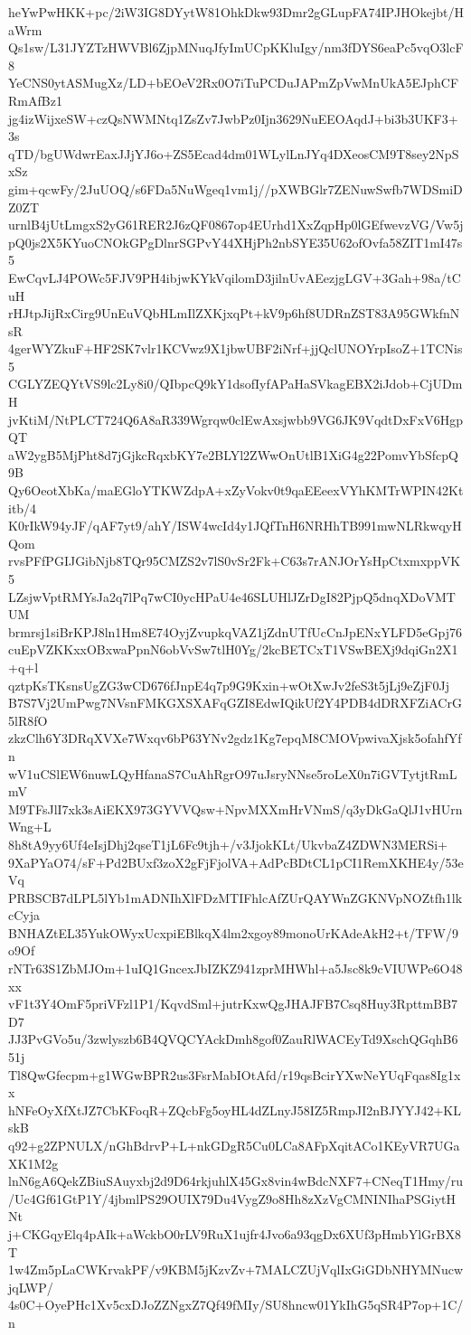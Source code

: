 heYwPwHKK+pc/2iW3IG8DYytW81OhkDkw93Dmr2gGLupFA74IPJHOkejbt/HaWrm
Qs1sw/L31JYZTzHWVBl6ZjpMNuqJfyImUCpKKluIgy/nm3fDYS6eaPc5vqO3lcF8
YeCNS0ytASMugXz/LD+bEOeV2Rx0O7iTuPCDuJAPmZpVwMnUkA5EJphCFRmAfBz1
jg4izWijxeSW+czQsNWMNtq1ZsZv7JwbPz0Ijn3629NuEEOAqdJ+bi3b3UKF3+3s
qTD/bgUWdwrEaxJJjYJ6o+ZS5Ecad4dm01WLylLnJYq4DXeosCM9T8sey2NpSxSz
gim+qcwFy/2JuUOQ/s6FDa5NuWgeq1vm1j//pXWBGlr7ZENuwSwfb7WDSmiDZ0ZT
urnlB4jUtLmgxS2yG61RER2J6zQF0867op4EUrhd1XxZqpHp0lGEfwevzVG/Vw5j
pQ0js2X5KYuoCNOkGPgDlnrSGPvY44XHjPh2nbSYE35U62ofOvfa58ZIT1mI47s5
EwCqvLJ4POWc5FJV9PH4ibjwKYkVqilomD3jilnUvAEezjgLGV+3Gah+98a/tCuH
rHJtpJijRxCirg9UnEuVQbHLmIlZXKjxqPt+kV9p6hf8UDRnZST83A95GWkfnNsR
4gerWYZkuF+HF2SK7vlr1KCVwz9X1jbwUBF2iNrf+jjQclUNOYrpIsoZ+1TCNis5
CGLYZEQYtVS9lc2Ly8i0/QIbpcQ9kY1dsofIyfAPaHaSVkagEBX2iJdob+CjUDmH
jvKtiM/NtPLCT724Q6A8aR339Wgrqw0clEwAxsjwbb9VG6JK9VqdtDxFxV6HgpQT
aW2ygB5MjPht8d7jGjkcRqxbKY7e2BLYl2ZWwOnUtlB1XiG4g22PomvYbSfcpQ9B
Qy6OeotXbKa/maEGloYTKWZdpA+xZyVokv0t9qaEEeexVYhKMTrWPIN42Ktitb/4
K0rIkW94yJF/qAF7yt9/ahY/ISW4wcId4y1JQfTnH6NRHhTB991mwNLRkwqyHQom
rvsPFfPGIJGibNjb8TQr95CMZS2v7lS0vSr2Fk+C63s7rANJOrYsHpCtxmxppVK5
LZsjwVptRMYsJa2q7lPq7wCI0ycHPaU4e46SLUHlJZrDgI82PjpQ5dnqXDoVMTUM
brmrsj1siBrKPJ8ln1Hm8E74OyjZvupkqVAZ1jZdnUTfUcCnJpENxYLFD5eGpj76
cuEpVZKKxxOBxwaPpnN6obVvSw7tlH0Yg/2kcBETCxT1VSwBEXj9dqiGn2X1+q+l
qztpKsTKsnsUgZG3wCD676fJnpE4q7p9G9Kxin+wOtXwJv2feS3t5jLj9eZjF0Jj
B7S7Vj2UmPwg7NVsnFMKGXSXAFqGZI8EdwIQikUf2Y4PDB4dDRXFZiACrG5lR8fO
zkzClh6Y3DRqXVXe7Wxqv6bP63YNv2gdz1Kg7epqM8CMOVpwivaXjsk5ofahfYfn
wV1uCSlEW6nuwLQyHfanaS7CuAhRgrO97uJsryNNse5roLeX0n7iGVTytjtRmLmV
M9TFsJlI7xk3sAiEKX973GYVVQsw+NpvMXXmHrVNmS/q3yDkGaQlJ1vHUrnWng+L
8h8tA9yy6Uf4eIsjDhj2qseT1jL6Fc9tjh+/v3JjokKLt/UkvbaZ4ZDWN3MERSi+
9XaPYaO74/sF+Pd2BUxf3zoX2gFjFjolVA+AdPcBDtCL1pCI1RemXKHE4y/53eVq
PRBSCB7dLPL5lYb1mADNIhXlFDzMTIFhlcAfZUrQAYWnZGKNVpNOZtfh1lkcCyja
BNHAZtEL35YukOWyxUcxpiEBlkqX4lm2xgoy89monoUrKAdeAkH2+t/TFW/9o9Of
rNTr63S1ZbMJOm+1uIQ1GncexJbIZKZ941zprMHWhl+a5Jsc8k9cVIUWPe6O48xx
vF1t3Y4OmF5priVFzl1P1/KqvdSml+jutrKxwQgJHAJFB7Csq8Huy3RpttmBB7D7
JJ3PvGVo5u/3zwlyszb6B4QVQCYAckDmh8gof0ZauRlWACEyTd9XschQGqhB651j
Tl8QwGfecpm+g1WGwBPR2us3FsrMabIOtAfd/r19qsBcirYXwNeYUqFqas8Ig1xx
hNFeOyXfXtJZ7CbKFoqR+ZQcbFg5oyHL4dZLnyJ58IZ5RmpJI2nBJYYJ42+KLskB
q92+g2ZPNULX/nGhBdrvP+L+nkGDgR5Cu0LCa8AFpXqitACo1KEyVR7UGaXK1M2g
lnN6gA6QekZBiuSAuyxbj2d9D64rkjuhlX45Gx8vin4wBdcNXF7+CNeqT1Hmy/ru
/Uc4Gf61GtP1Y/4jbmlPS29OUIX79Du4VygZ9o8Hh8zXzVgCMNINIhaPSGiytHNt
j+CKGqyElq4pAIk+aWckbO0rLV9RuX1ujfr4Jvo6a93qgDx6XUf3pHmbYlGrBX8T
1w4Zm5pLaCWKrvakPF/v9KBM5jKzvZv+7MALCZUjVqlIxGiGDbNHYMNucwjqLWP/
4s0C+OyePHc1Xv5cxDJoZZNgxZ7Qf49fMIy/SU8hncw01YkIhG5qSR4P7op+1C/n
